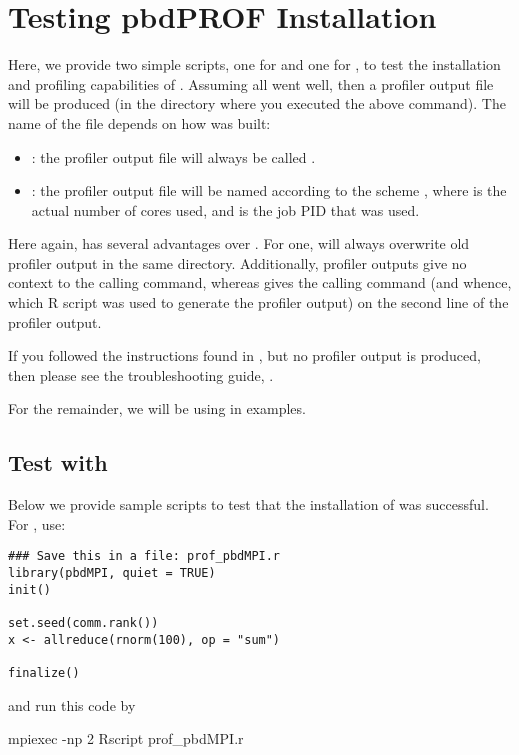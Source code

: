 \section{Testing pbdPROF Installation}
\label{sec:testing}

Here, we provide two simple  scripts, one for  and one for 
, to test the installation and profiling capabilities of 
.  Assuming all went well, then a profiler output file will be produced (in the directory where you executed the above command).  The name of the file depends on how  was built:

\begin{itemize}
  \item {}: the profiler output file will always be called .  
  \item {}: the profiler output file will be named according to the scheme , where  is the actual number of cores used, and  is the job PID that was used.
\end{itemize}

Here again,  has several advantages over .  For one,  will always overwrite old profiler output in the same directory.  Additionally,  profiler outputs give no context to the calling command, whereas  gives the calling command (and whence, which R script was used to generate the profiler output) on the second line of the profiler output.

If you followed the instructions found in , but no profiler output is produced, then please see the troubleshooting guide, \instdebug.

For the remainder, we will be using  in examples.

\subsection{Test with }

Below we provide sample scripts to test that the installation of
 was successful.  For , use:
\begin{lstlisting}[language=rr,title=Test script for pbdMPI]
### Save this in a file: prof_pbdMPI.r
library(pbdMPI, quiet = TRUE)
init()

set.seed(comm.rank())
x <- allreduce(rnorm(100), op = "sum")

finalize()
\end{lstlisting}
and run this code by
\begin{Code}
mpiexec -np 2 Rscript prof_pbdMPI.r
\end{Code}

